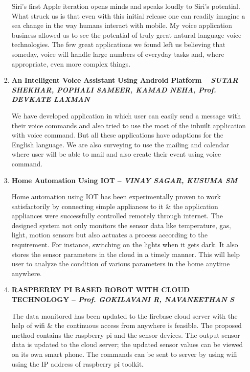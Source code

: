 \documentclass[16pt,oneside,a4paper]{article}
\begin{document}
\begin{enumerate}
Siri's first Apple iteration opens minds and speaks loudly to Siri's potential. What struck us is that even with this initial release one can readily imagine a sea change in the way humans interact with mobile. My voice application business allowed us to see the potential of truly great natural language voice technologies. The few great applications we found left us believing that someday, voice will handle large numbers of everyday tasks and, where appropriate, even more complex things.\\

\item \textbf{An Intelligent Voice Assistant Using Android Platform -- \textit{SUTAR SHEKHAR, POPHALI SAMEER, KAMAD NEHA, Prof. DEVKATE LAXMAN}}

We have developed application in which user can easily send a message with their voice commands and also tried to use the most of the inbuilt application with voice command. But all these applications have adaptions for the English language. We are also surveying to use the mailing and calendar where user will be able to mail and also create their event using voice command.\\

\item \textbf{Home Automation Using IOT  -- \textit{VINAY SAGAR, KUSUMA SM}}

Home automation using IOT has been experimentally proven to work satisfactorily by connecting simple appliances to it \& the application appliances were successfully controlled remotely through internet. The designed system not only monitors the sensor data like temperature, gas, light, motion sensors but also actuates a process according to the requirement. For instance, switching on the lights when it gets dark. It also stores the sensor parameters in the cloud in a timely manner. This will help user to analyze the condition of various parameters in the home anytime anywhere.\\

\item \textbf{RASPBERRY PI BASED ROBOT WITH CLOUD TECHNOLOGY -- \textit{ Prof. GOKILAVANI R, NAVANEETHAN S}}

The data monitored has been updated to the firebase cloud server with the help of wifi \& the continuous access from anywhere is feasible. The proposed method contains the raspberry pi and the sensor devices. The output sensor data is updated to the cloud server; the updated sensor values can be viewed on its own smart phone. The commands can be sent to server by using wifi using the IP address of raspberry pi toolkit. \\


\end{enumerate}
\end{document}
